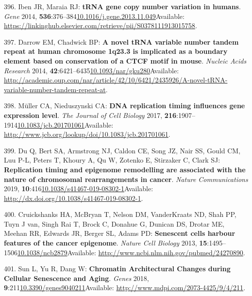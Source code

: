 \documentclass[
]{book}
\begin{document}
\leavevmode\hypertarget{ref-Iben2015}{}%
396. Iben JR, Maraia RJ: \textbf{tRNA gene copy number variation in humans}. \emph{Gene} 2014, \textbf{536}:376--384\href{https://doi.org/10.1016/j.gene.2013.11.049}{10.1016/j.gene.2013.11.049}Available: \url{https://linkinghub.elsevier.com/retrieve/pii/S0378111913015758}.

\leavevmode\hypertarget{ref-Darrow2014}{}%
397. Darrow EM, Chadwick BP: \textbf{A novel tRNA variable number tandem repeat at human chromosome 1q23.3 is implicated as a boundary element based on conservation of a CTCF motif in mouse}. \emph{Nucleic Acids Research} 2014, \textbf{42}:6421--6435\href{https://doi.org/10.1093/nar/gku280}{10.1093/nar/gku280}Available: \url{http://academic.oup.com/nar/article/42/10/6421/2435926/A-novel-tRNA-variable-number-tandem-repeat-at}.

\leavevmode\hypertarget{ref-Muller2017}{}%
398. Müller CA, Nieduszynski CA: \textbf{DNA replication timing influences gene expression level}. \emph{The Journal of Cell Biology} 2017, \textbf{216}:1907--1914\href{https://doi.org/10.1083/jcb.201701061}{10.1083/jcb.201701061}Available: \url{http://www.jcb.org/lookup/doi/10.1083/jcb.201701061}.

\leavevmode\hypertarget{ref-Du2019}{}%
399. Du Q, Bert SA, Armstrong NJ, Caldon CE, Song JZ, Nair SS, Gould CM, Luu P-L, Peters T, Khoury A, Qu W, Zotenko E, Stirzaker C, Clark SJ: \textbf{Replication timing and epigenome remodelling are associated with the nature of chromosomal rearrangements in cancer}. \emph{Nature Communications} 2019, \textbf{10}:416\href{https://doi.org/10.1038/s41467-019-08302-1}{10.1038/s41467-019-08302-1}Available: \url{http://dx.doi.org/10.1038/s41467-019-08302-1}.

\leavevmode\hypertarget{ref-Cruickshanks2013}{}%
400. Cruickshanks HA, McBryan T, Nelson DM, VanderKraats ND, Shah PP, Tuyn J van, Singh Rai T, Brock C, Donahue G, Dunican DS, Drotar ME, Meehan RR, Edwards JR, Berger SL, Adams PD: \textbf{Senescent cells harbour features of the cancer epigenome}. \emph{Nature Cell Biology} 2013, \textbf{15}:1495--1506\href{https://doi.org/10.1038/ncb2879}{10.1038/ncb2879}Available: \url{http://www.ncbi.nlm.nih.gov/pubmed/24270890}.

\leavevmode\hypertarget{ref-Sun2018}{}%
401. Sun L, Yu R, Dang W: \textbf{Chromatin Architectural Changes during Cellular Senescence and Aging}. \emph{Genes} 2018, \textbf{9}:211\href{https://doi.org/10.3390/genes9040211}{10.3390/genes9040211}Available: \url{http://www.mdpi.com/2073-4425/9/4/211}.
\end{document}
